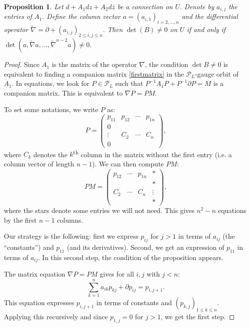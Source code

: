 \documentclass[10pt,a4paper]{amsart}
\newtheorem{prop}{Proposition}
\begin{document}
\begin{prop}\label{existence-para-gauge}
Let $d+A_1dz+A_2d\bar{z}$ be a connection on $U$. Denote by $a_{i,j}$ the entries of $A_1$. Define the column vector $a=(a_{i,1})_{i=2,...,n}$ and the differential operator $\widetilde{\nabla}=\partial+(a_{i,j})_{2\leq i,j\leq n}$. Then $\det(B)\neq 0$ on $U$ if and only if $\det(a,\widetilde{\nabla}a,...,\widetilde{\nabla}^{n-2}a)\neq 0$.
\end{prop}

\begin{proof}
Since $A_1$ is the matrix of the operator $\nabla$, the condition $\det B\neq 0$ is equivalent to finding a companion matrix \eqref{firstmatrix} in the $\mathcal{P}_L$-gauge orbit of $A_1$.
In equations, we look for $P\in\mathcal{P}_L$ such that $P^{-1}A_1P+P^{-1}\partial P=M$ is a companion matrix. This is equivalent to $\nabla P=PM.$

To set some notations, we write $P$ as:
$$P= \begin{pmatrix}
	p_{11} & p_{12} & \cdots &p_{1n} \\
	0 & &  &  \\
	\vdots & C_2& \cdots& C_n \\
	0 &  &  & 
\end{pmatrix},$$
where $C_k$ denotes the $k$\textsuperscript{th} column in the matrix without the first entry (i.e. a column vector of length $n-1$).
We can then compute $PM$:
$$PM=\begin{pmatrix}p_{12}&\cdots &p_{1n}&*\\ &&&* \\ C_2&\cdots &C_n&\vdots \\ &&&*\end{pmatrix},$$
where the stars denote some entries we will not need. This gives $n^2-n$ equations by the first $n-1$ columns.

Our strategy is the following: first we express $p_{ij}$ for $j>1$ in terms of $a_{ij}$ (the ``constants'') and $p_{11}$ (and its derivatives). Second, we get an expression of $p_{11}$ in terms of $a_{ij}$. In this second step, the condition of the proposition appears.

The matrix equation $\nabla P=PM$ gives for all $i,j$ with $j<n$:
\begin{equation}\label{auxmat}
\sum_{k=1}^n a_{ik}p_{kj}+\partial p_{ij} = p_{i,j+1}.
\end{equation} 
This equation expresses $p_{i,j+1}$ in terms of constants and $(p_{k,j})_{1\leq k\leq n}$. Applying this recursively and since $p_{1,j}=0$ for $j>1$, we get the first step.


\end{proof}
\end{document}
